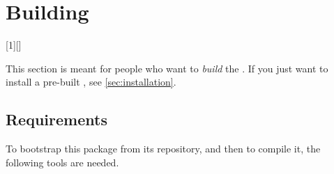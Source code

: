 \chapter{Building \usdk}
\label{sec:build}

[1][]
  {\cxxPre%
    }
  {\cxxPost}

This section is meant for people who want to \emph{build} the \usdk.  If
you just want to install a pre-built \usdk, see \autoref{sec:installation}.

\section{Requirements}
\label{sec:build:req}

To bootstrap this package from its repository, and then to compile it,
the following tools are needed.


